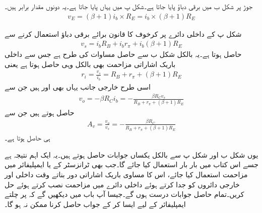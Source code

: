 جوڑ  پر شکل  ب میں  برقی دباؤ پایا جاتا ہے۔شکل  پ میں یہاں  پایا جاتا ہے۔یہ دونوں مقدار برابر ہیں۔
\begin{align*}
v_E=\left(\beta+1 \right) i_b \times R_E =i_b \times \left(\beta+1 \right)R_E
\end{align*}

شکل  پ کے داخلی دائرے پر کرخوف کا قانون برائے برقی دباؤ استعمال کرنے سے
\begin{align*}
v_s = i_b R_B+i_b r_{\pi}  + i_b \left(\beta+1 \right )R_E
\end{align*}
حاصل ہوتا ہے۔یہ بالکل شکل  ب سے حاصل مساوات کی طرح ہے  جس سے داخلی باریک اشاراتی مزاحمت بھی بالکل وہی حاصل ہوتا ہے یعنی
\begin{align*}
r_i=\frac{v_s}{i_b}=R_B+r_{\pi}+\left(\beta+1 \right )R_E
\end{align*}
اسی طرح خارجی جانب یہاں بھی  اور  ہیں جن سے
\begin{align*}
v_o=-\beta R_C i_b = -\frac{\beta R_C v_s}{R_B+r_{\pi}+\left ( \beta+1\right )R_E}
\end{align*}
حاصل ہوتے ہیں جن سے
\begin{align*}
A_v=\frac{v_o}{v_s}=-\frac{\beta R_C}{R_B+r_{\pi}+\left(\beta+1 \right )R_E}
\end{align*} 
ہی حاصل ہوتا ہے۔

یوں شکل  ب اور شکل  پ سے بالکل یکساں جوابات حاصل ہوتے ہیں۔یہ ایک اہم نتیجہ ہے جسے اس کتاب میں بار بار استعمال کیا جائے گا۔جب بھی  ٹرانزسٹر کے  یا  ایمپلیفائر میں مزاحمت  استعمال کیا جائے، اس کا مساوی باریک اشاراتی دور بناتے وقت داخلی اور خارجی دائروں کو جدا کرتے ہوئے داخلی دائرے میں  مزاحمت نصب کرتے ہوئے حل کریں۔تمام حاصل جوابات درست ہوں گے۔جیسا آپ  باب  میں دیکھیں گے کہ  پر چلتے ایمپلیفائر کے لیے ایسا کر کے جواب حاصل کرنا ممکن نہ ہو گا۔

